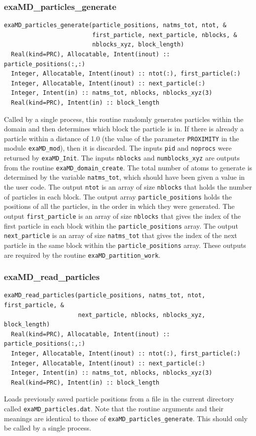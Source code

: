 \documentclass[paper=a4, fontsize=11pt,bibtotoc]{scrartcl}		%
\newcommand{\TT}[1]{\texttt{#1}}
\begin{document}
\subsubsection{exaMD\_particles\_generate}

\begin{verbatim}
exaMD_particles_generate(particle_positions, natms_tot, ntot, &
                         first_particle, next_particle, nblocks, &
                         nblocks_xyz, block_length)
  Real(kind=PRC), Allocatable, Intent(inout) :: particle_positions(:,:)
  Integer, Allocatable, Intent(inout) :: ntot(:), first_particle(:)
  Integer, Allocatable, Intent(inout) :: next_particle(:)
  Integer, Intent(in) :: natms_tot, nblocks, nblocks_xyz(3)
  Real(kind=PRC), Intent(in) :: block_length
\end{verbatim}
Called by a single process, this routine randomly generates particles within the domain and then determines which block the particle is in. If there 
is already a particle within a distance of 1.0 (the value of the parameter \TT{PROXIMITY} in the module \TT{exaMD\_mod}), then it is discarded. The 
inputs \TT{pid} and \TT{noprocs} were returned by \TT{exaMD\_Init}. The inputs \TT{nblocks} and \TT{numblocks\_xyz} are outputs from the routine 
\TT{exaMD\_domain\_create}. The total number of atoms to generate is determined by the variable \TT{natms\_tot}, which 
should have been given a value in the user code. The output \TT{ntot} is an array of size \TT{nblocks} that holds the number of 
particles in each block. The output array \TT{particle\_positions} holds the positions of all the particles, in the order in which they were 
generated. The output \TT{first\_particle} is an array of size \TT{nblocks} that gives the index of the first particle in each block within the 
\TT{particle\_positions} array. The output \TT{next\_particle} is an array of size \TT{natms\_tot} that gives the index of the next particle in the 
same block within the \TT{particle\_positions} array. These outputs are required by the routine \TT{exaMD\_partition\_work}.

\subsubsection{exaMD\_read\_particles}

\begin{verbatim}
exaMD_read_particles(particle_positions, natms_tot, ntot, first_particle, &
                     next_particle, nblocks, nblocks_xyz, block_length)
  Real(kind=PRC), Allocatable, Intent(inout) :: particle_positions(:,:)
  Integer, Allocatable, Intent(inout) :: ntot(:), first_particle(:)
  Integer, Allocatable, Intent(inout) :: next_particle(:)
  Integer, Intent(in) :: natms_tot, nblocks, nblocks_xyz(3)
  Real(kind=PRC), Intent(in) :: block_length
\end{verbatim}
Loads previously saved particle positions from a file in the current directory called \TT{exaMD\_particles.dat}. Note that the routine arguments and 
their meanings are identical to those of \TT{exaMD\_particles\_generate}. This should only be called by a single process.
\end{document}
